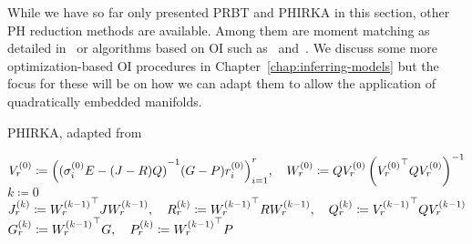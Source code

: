 \begin{remark}
    While we have so far only presented \ac{PRBT} and \ac{PHIRKA} in this section, other \ac{PH} reduction methods are available.
    Among them are moment matching as detailed in~\cite{Polyuga2010} or algorithms based on \ac{OI} such as~\cite{BGD2020} and~\cite{Lee2022}.
    We discuss some more optimization-based \ac{OI} procedures in Chapter~\ref{chap:inferring-models} but the focus for these will be on how we can adapt them to allow the application of quadratically embedded manifolds.
\end{remark}

\begin{algorithm}[ht]
    \caption{\ac{PHIRKA}, adapted from~\cite[Algorithm~1]{Gugercin2012}}\label{alg:ph-irka}
    $V_r^{(0)} \coloneqq {\left( {(\sigma_i^{(0)} E - (J - R) Q)}\inv (G - P) r_i^{(0)} \right)}_{i = 1}^r,\quad W_r^{(0)} \coloneqq Q V_r^{(0)} \left( {V_r^{(0)}}\trans Q V_r^{(0)} \right)\inv$\;
    $k \coloneqq 0$\;
    $J_r^{(k)} \coloneqq {W_r^{(k - 1)}}^{\top} J W_r^{(k - 1)},\quad R_r^{(k)} \coloneqq {W_r^{(k - 1)}}^{\top} R W_r^{(k - 1)},\quad Q_r^{(k)} \coloneqq {V_r^{(k - 1)}}^{\top} Q V_r^{(k - 1)}$\;
    $G_r^{(k)} \coloneqq {W_r^{(k - 1)}}^{\top} G,\quad P_r^{(k)} \coloneqq {W_r^{(k - 1)}}^{\top} P$\;
\end{algorithm}

